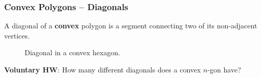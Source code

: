 \documentclass[aspectratio=169,11pt,svgnames]{beamer}
\begin{document}
\begin{frame}
 \frametitle{Convex Polygons -- Diagonals}
 \begin{tcolorbox}[title=Diagonal in A Convex Polygon]
  A \alert{diagonal} of a \textbf{convex} polygon is a segment connecting two of
  its non-adjacent vertices.
 \end{tcolorbox}
 \begin{minipage}[c][4cm][c]{0.48\textwidth}
  \begin{figure}[H]
   \centering
   \caption*{\textcolor{PolygonCyan}{Diagonal} in a convex hexagon.}
  \end{figure}
 \end{minipage}
 \pause
 \begin{minipage}[c][4cm][c]{.48\textwidth}
  \vspace*{\fill}
  \textcolor{PolygonOrange}{\textbf{Voluntary HW}}: How many different diagonals
  does a convex $n$-gon have?
  \vspace*{\fill}
 \end{minipage}
\end{frame}
\end{document}
